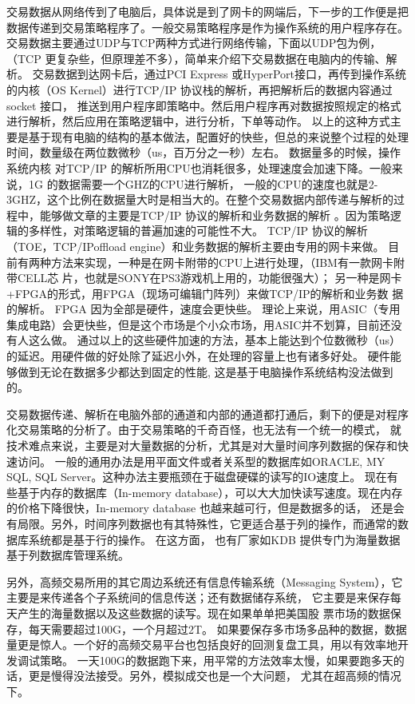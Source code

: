 交易数据从网络传到了电脑后，具体说是到了网卡的网端后，下一步的工作便是把数据传递到交易策略程序了。一般交易策略程序是作为操作系统的用户程序存在。
交易数据主要通过UDP与TCP两种方式进行网络传输，下面以UDP包为例，（TCP 更复杂些，但原理差不多），简单来介绍下交易数据在电脑内的传输、解析。
交易数据到达网卡后，通过PCI Express 或HyperPort接口，再传到操作系统的内核（OS Kernel）进行TCP/IP 协议栈的解析，再把解析后的数据内容通过socket 接口，
推送到用户程序即策略中。然后用户程序再对数据按照规定的格式进行解析，然后应用在策略逻辑中，进行分析，下单等动作。
以上的这种方式主要是基于现有电脑的结构的基本做法，配置好的快些，但总的来说整个过程的处理时间，数量级在两位数微秒（us，百万分之一秒）左右。
数据量多的时候，操作系统内核 对TCP/IP 的解析所用CPU也消耗很多，处理速度会加速下降。一般来说，1G 的数据需要一个GHZ的CPU进行解析，
一般的CPU的速度也就是2-3GHZ，这个比例在数据量大时是相当大的。在整个交易数据内部传递与解析的过程中，能够做文章的主要是TCP/IP 协议的解析和业务数据的解析
。因为策略逻辑的多样性，对策略逻辑的普遍加速的可能性不大。 TCP/IP 协议的解析（TOE，TCP/IPoffload engine）和业务数据的解析主要由专用的网卡来做。
目前有两种方法来实现，一种是在网卡附带的CPU上进行处理，（IBM有一款网卡附带CELL芯 片，也就是SONY在PS3游戏机上用的，功能很强大）；
另一种是网卡+FPGA的形式，用FPGA（现场可编辑门阵列）来做TCP/IP的解析和业务数 据的解析。 FPGA 因为全部是硬件，速度会更快些。
理论上来说，用ASIC（专用集成电路）会更快些，但是这个市场是个小众市场，用ASIC并不划算，目前还没有人这么做。 
通过以上的这些硬件加速的方法，基本上能达到个位数微秒（us）的延迟。用硬件做的好处除了延迟小外，在处理的容量上也有诸多好处。
硬件能够做到无论在数据多少都达到固定的性能, 这是基于电脑操作系统结构没法做到的。
	    
交易数据传递、解析在电脑外部的通道和内部的通道都打通后，剩下的便是对程序化交易策略的分析了。由于交易策略的千奇百怪，也无法有一个统一的模式，
就技术难点来说，主要是对大量数据的分析，尤其是对大量时间序列数据的保存和快速访问。
一般的通用办法是用平面文件或者关系型的数据库如ORACLE, MY SQL, SQL Server。这种办法主要瓶颈在于磁盘硬碟的读写的IO速度上。
现在有些基于内存的数据库（In-memory database），可以大大加快读写速度。现在内存的价格下降很快，In-memory database 也越来越可行，但是数据多的话，
还是会有局限。另外，时间序列数据也有其特殊性，它更适合基于列的操作，而通常的数据库系统都是基于行的操作。
在这方面， 也有厂家如KDB 提供专门为海量数据基于列数据库管理系统。
		 
另外，高频交易所用的其它周边系统还有信息传输系统（Messaging System），它主要是来传递各个子系统间的信息传送；还有数据储存系统，
它主要是来保存每天产生的海量数据以及这些数据的读写。现在如果单单把美国股 票市场的数据保存，每天需要超过100G，一个月超过2T。
如果要保存多市场多品种的数据，数据量更是惊人。一个好的高频交易平台也包括良好的回测复盘工具，用以有效率地开发调试策略。
一天100G的数据跑下来，用平常的方法效率太慢，如果要跑多天的话，更是慢得没法接受。另外，模拟成交也是一个大问题， 尤其在超高频的情况下。
		  
